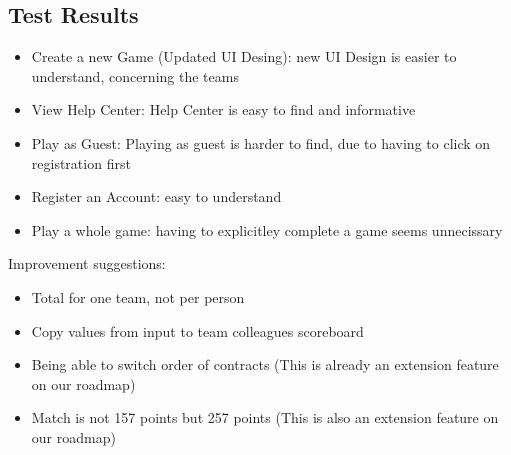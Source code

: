 \subsection{Test Results}
\begin{itemize}
    \item Create a new Game (Updated UI Desing): new UI Design is easier to understand, concerning the teams
    \item View Help Center: Help Center is easy to find and informative
    \item Play as Guest: Playing as guest is harder to find, due to having to click on registration first
    \item Register an Account: easy to understand
    \item Play a whole game: having to explicitley complete a game seems unnecissary
\end{itemize}
Improvement suggestions: 
\begin{itemize}
    \item Total for one team, not per person
    \item Copy values from input to team colleagues scoreboard
    \item Being able to switch order of contracts (This is already an extension feature on our roadmap)
    \item Match is not 157 points but 257 points (This is also an extension feature on our roadmap)
\end{itemize}
